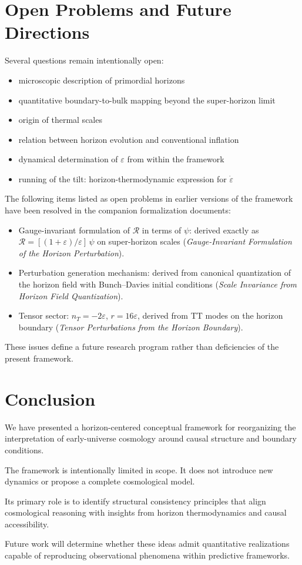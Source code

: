 \documentclass[12pt,a4paper]{article}
\begin{document}
\section{Open Problems and Future Directions}

Several questions remain intentionally open:

\begin{itemize}
  \item microscopic description of primordial horizons
  \item quantitative boundary-to-bulk mapping beyond the super-horizon limit
  \item origin of thermal scales
  \item relation between horizon evolution and conventional inflation
  \item dynamical determination of $\varepsilon$ from within the framework
  \item running of the tilt: horizon-thermodynamic expression for $\dot{\varepsilon}$
\end{itemize}

The following items listed as open problems in earlier versions of the framework have been resolved in the companion formalization documents:

\begin{itemize}
  \item Gauge-invariant formulation of $\mathcal{R}$ in terms of $\psi$: derived exactly as $\mathcal{R} = [(1+\varepsilon)/\varepsilon]\,\psi$ on super-horizon scales (\textit{Gauge-Invariant Formulation of the Horizon Perturbation}).
  \item Perturbation generation mechanism: derived from canonical quantization of the horizon field with Bunch--Davies initial conditions (\textit{Scale Invariance from Horizon Field Quantization}).
  \item Tensor sector: $n_T = -2\varepsilon$, $r = 16\varepsilon$, derived from TT modes on the horizon boundary (\textit{Tensor Perturbations from the Horizon Boundary}).
\end{itemize}

These issues define a future research program rather than deficiencies of the present framework.

\section{Conclusion}

We have presented a horizon-centered conceptual framework for reorganizing the interpretation of early-universe cosmology around causal structure and boundary conditions.

The framework is intentionally limited in scope. It does not introduce new dynamics or propose a complete cosmological model.

Its primary role is to identify structural consistency principles that align cosmological reasoning with insights from horizon thermodynamics and causal accessibility.

Future work will determine whether these ideas admit quantitative realizations capable of reproducing observational phenomena within predictive frameworks.
\end{document}
